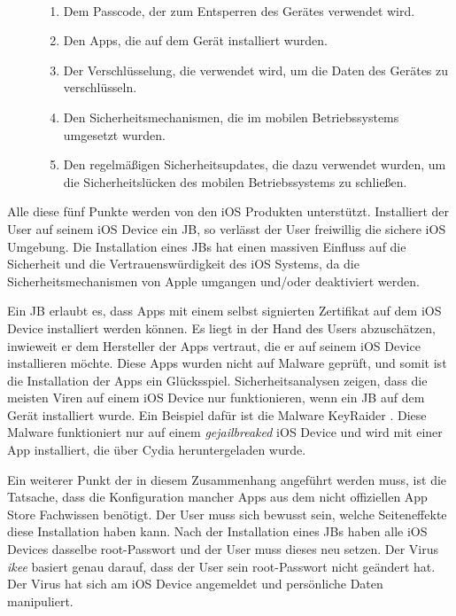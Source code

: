 \begin{description}
    \item[\parbox{\textwidth} {Die Sicherheit und Vertrauenswürdigkeit eines mobilen Gerätes hängt von mehreren Faktoren ab}]~\par
    \begin{enumerate}
        \item Dem Passcode, der zum Entsperren des Gerätes verwendet wird.
        \item Den Apps, die auf dem Gerät installiert wurden. 
        \item Der Verschlüsselung, die verwendet wird, um die Daten des Gerätes zu verschlüsseln.
        \item Den Sicherheitsmechanismen, die im mobilen Betriebssystems umgesetzt wurden.
        \item Den regelmäßigen Sicherheitsupdates, die dazu verwendet wurden, um die Sicherheitslücken des mobilen Betriebssystems zu schließen.  
    \end{enumerate}
\end{description} 
Alle diese fünf Punkte werden von den iOS Produkten unterstützt. Installiert der User auf seinem iOS Device ein JB, so verlässt der User freiwillig die sichere iOS Umgebung. Die Installation eines JBs hat einen massiven Einfluss auf die Sicherheit und die Vertrauenswürdigkeit des iOS Systems, da die Sicherheitsmechanismen von Apple umgangen und/oder deaktiviert werden.\par  
Ein JB erlaubt es, dass Apps mit einem selbst signierten Zertifikat auf dem iOS Device installiert werden können. Es liegt in der Hand des Users abzuschätzen, inwieweit er dem Hersteller der Apps vertraut, die er auf seinem iOS Device installieren möchte. Diese Apps wurden nicht auf Malware geprüft, und somit ist die Installation der Apps ein Glücksspiel. Sicherheitsanalysen zeigen, dass die meisten Viren auf einem iOS Device nur funktionieren, wenn ein JB auf dem Gerät installiert wurde. Ein Beispiel dafür ist die Malware KeyRaider \cite{KeyRaider}. Diese Malware funktioniert nur auf einem \textit{\glqq gejailbreaked\grqq{}} iOS Device und wird mit einer App installiert, die über Cydia heruntergeladen wurde. \par 
 Ein weiterer Punkt der in diesem Zusammenhang angeführt werden muss, ist die Tatsache, dass die Konfiguration mancher Apps aus dem nicht offiziellen App Store Fachwissen benötigt. Der User muss sich bewusst sein, welche Seiteneffekte diese Installation haben kann. Nach der Installation eines JBs haben alle iOS Devices dasselbe root-Passwort und der User muss dieses neu setzen. Der Virus \textit{\glqq ikee\grqq{}} basiert genau darauf, dass der User sein root-Passwort nicht geändert hat. Der Virus hat sich am iOS Device angemeldet und persönliche Daten manipuliert.\par 
